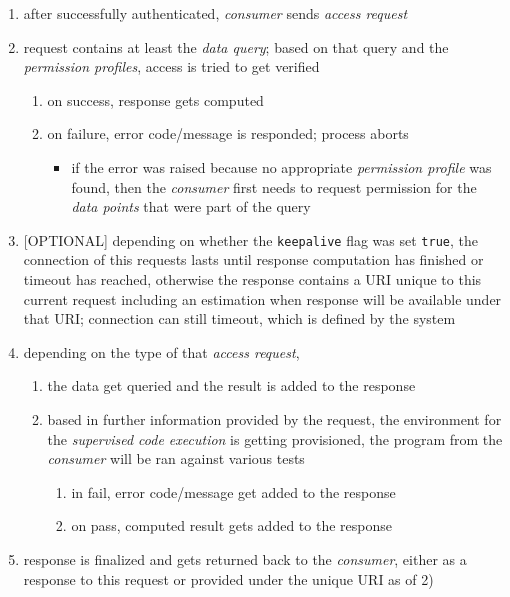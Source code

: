\documentclass[12pt,english,a4paper,titlepage,cleardoublepage=empty,dottedtoc]{report}
\providecommand{\tightlist}{%
  \setlength{\itemsep}{0pt}\setlength{\parskip}{0pt}}
\begin{document}
\begin{enumerate}
\def\labelenumi{\arabic{enumi})}
\setcounter{enumi}{-1}
\item
  after successfully authenticated, \emph{consumer} sends \emph{access
  request}
\item
  request contains at least the \emph{data query}; based on that query
  and the \emph{permission profiles}, access is tried to get verified

  \begin{enumerate}
  \def\labelenumii{\alph{enumii})}
  \tightlist
  \item
    on success, response gets computed
  \item
    on failure, error code/message is responded; process aborts

    \begin{itemize}
    \tightlist
    \item
      if the error was raised because no appropriate \emph{permission
      profile} was found, then the \emph{consumer} first needs to
      request permission for the \emph{data points} that were part of
      the query
    \end{itemize}
  \end{enumerate}
\item
  {[}OPTIONAL{]} depending on whether the \texttt{keepalive} flag was
  set \texttt{true}, the connection of this requests lasts until
  response computation has finished or timeout has reached, otherwise
  the response contains a URI unique to this current request including
  an estimation when response will be available under that URI;
  connection can still timeout, which is defined by the system
\item
  depending on the type of that \emph{access request},

  \begin{enumerate}
  \def\labelenumii{(\Alph{enumii})}
  \tightlist
  \item
    the data get queried and the result is added to the response
  \item
    based in further information provided by the request, the
    environment for the \emph{supervised code execution} is getting
    provisioned, the program from the \emph{consumer} will be ran
    against various tests

    \begin{enumerate}
    \def\labelenumiii{\alph{enumiii})}
    \tightlist
    \item
      in fail, error code/message get added to the response
    \item
      on pass, computed result gets added to the response
    \end{enumerate}
  \end{enumerate}
\item
  response is finalized and gets returned back to the \emph{consumer},
  either as a response to this request or provided under the unique URI
  as of 2)
\end{enumerate}
\end{document}
